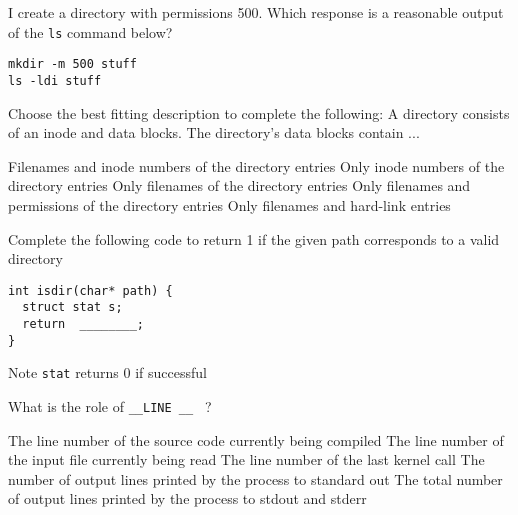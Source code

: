 \variant
I create a directory with permissions 500. Which response is a reasonable output of the {\tt ls} command below?
\begin{verbatim}
mkdir -m 500 stuff
ls -ldi stuff
\end{verbatim}
\begin{answers}
\end{answers}
\begin{solution}
\end{solution}

\variant
Choose the best fitting description to complete the following: A directory consists of an inode and data blocks. The directory's data blocks contain ...
\begin{answers}
\correctanswer Filenames and inode numbers of the directory entries
\answer Only inode numbers of the directory entries
\answer Only filenames of the directory entries
\answer Only filenames and permissions of the directory entries
\answer Only filenames and hard-link entries
\end{answers}
\begin{solution}
\end{solution}


\variant
Complete the following code to return 1 if the given path corresponds to a valid directory
\begin{verbatim}
int isdir(char* path) {
  struct stat s;
  return  ________;
}
\end{verbatim}
\begin{answers}
\end{answers}
\begin{solution}
Note {\tt stat} returns 0 if successful
\end{solution}

\variant
What is the role of {\tt __LINE __ } ?
\begin{answers}
\correctanswer The line number of the source code currently being compiled
\answer The line number of the input file currently being read
\answer The line number of the last kernel call
\answer The number of output lines printed by the process to standard out
\answer The total number of output lines printed by the process to stdout and stderr
\end{answers}
\begin{solution}
\end{solution}

